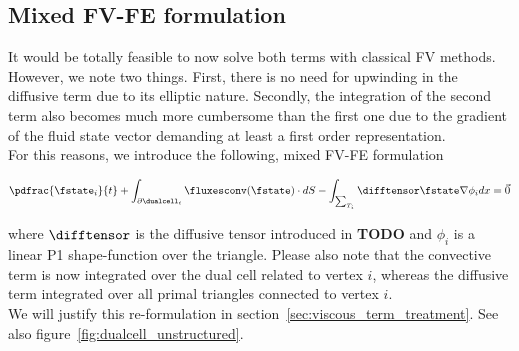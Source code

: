 \documentclass[../main.tex]{subfiles}
\begin{document}
\subsection{Mixed \ac{FV}-\ac{FE} formulation}\label{sec:mixed_FV_FE_formulation}
It would be totally feasible to now solve both terms with classical \ac{FV} methods. However, we note two things. First, there is no need for upwinding in the diffusive term due to its elliptic nature.
Secondly, the integration of the second term also becomes much more cumbersome than the first one due to the gradient of the fluid state vector demanding at least a first order representation.\\
For this reasons, we introduce the following, mixed \ac{FV}-\ac{FE} formulation

\begin{align}\label{eq_mixed_FV_FE}
\pdfrac{\fstate_i}{t} +
\int_{\partial\dualcell_i} \fluxesconv(\fstate)\cdot dS -
\int_{\sum_{T_i}} \difftensor \fstate \nabla \phi_i dx =
\vec{0}
\end{align}

where $\difftensor$ is the diffusive tensor introduced in \textbf{TODO} and $\phi_i$ is a linear P1 shape-function over the triangle.
Please also note that the convective term is now integrated over the dual cell related to vertex $i$, whereas the diffusive term integrated over all primal triangles connected to vertex $i$.\\
We will justify this re-formulation in section~\ref{sec:viscous_term_treatment}. See also figure~\ref{fig:dualcell_unstructured}.
\end{document}
